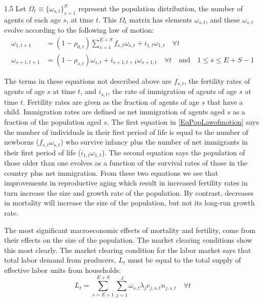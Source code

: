 \documentclass[letterpaper,12pt]{article}
\theoremstyle{definition}
\begin{document}
\begin{spacing}{1.5}
    Let $\Omega_t\equiv\{\omega_{s,t}\}_{s=1}^S$ represent the population distribution, the number of agents of each age $s$, at time $t$. This $\Omega_t$ matrix has elements $\omega_{s,t}$, and these $\omega_{s,t}$ evolve according to the following law of motion:
    \begin{equation}\label{EqPopLawofmotion}
      \begin{split}
        \omega_{1,t+1} &= (1 - \rho_{0,t})\sum_{s=1}^{E+S} f_{s,t}\omega_{s,t} + i_{1,t}\omega_{1,t}\quad\forall t \\
        \omega_{s+1,t+1} &= (1 - \rho_{s,t})\omega_{s,t} + i_{s+1, t+1}\omega_{s+1,t}\quad\forall t\quad\text{and}\quad 1\leq s \leq E+S-1
      \end{split}
    \end{equation}

    The terms in these equations not described above are $f_{s,t}$, the fertility rates of agents of age $s$ at time $t$, and $i_{s,t}$, the rate of immigration of agents of age $s$ at time $t$. Fertility rates are given as the fraction of agents of age $s$ that have a child. Immigration rates are defined as net immigration of agents aged $s$ as a fraction of the population aged $s$. The first equation in \eqref{EqPopLawofmotion} says the number of individuals in their first period of life is equal to the number of newborns ($f_{s,t}\omega_{s,t}$) who survive infancy plus the number of net immigrants in their first period of life ($i_{1,t}\omega_{1,t}$). The second equation says the population of those older than one evolves as a function of the survival rates of those in the country plus net immigration. From these two equations we see that improvements in reproductive aging which result in increased fertility rates in turn increase the size and growth rate of the population. By contrast, decreases in mortality will increase the size of the population, but not its long-run growth rate.

    The most significant macroeconomic effects of mortality and fertility, come from their effects on the size of the population.  The market clearing conditions show this most clearly.  The market clearing condition for the labor market says that total labor demand from producers, $L_{t}$ must be equal to the total supply of effective labor units from households:
    \begin{equation}\label{EqMarkClrLab}
      L_{t} = \sum_{s=E+1}^{E+S}\sum_{j=1}^{J} \omega_{s,t}\lambda_j e_{j,s,t}n_{j,s,t} \quad \forall t
    \end{equation}


\end{spacing}
\end{document}
